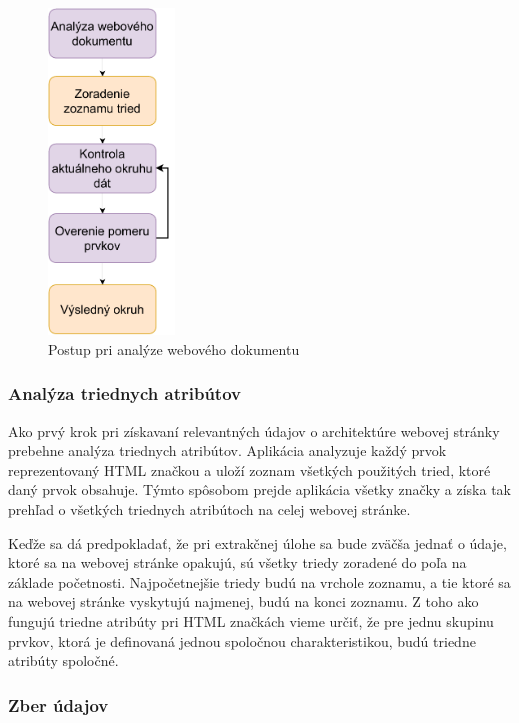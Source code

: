  \begin{figure}[hbt]
	\centering
	\includegraphics[width=0.3\textwidth]{obrazky-figures/analysis.pdf}
	\caption{Postup pri analýze webového dokumentu}
	\label{analysispdf}
\end{figure}

\newpage

\subsubsection{Analýza triednych atribútov}

Ako prvý krok pri získavaní relevantných údajov o architektúre webovej stránky prebehne analýza triednych atribútov. Aplikácia analyzuje každý prvok reprezentovaný HTML značkou a uloží zoznam všetkých použitých tried, ktoré daný prvok obsahuje. Týmto spôsobom prejde aplikácia všetky značky a získa tak prehľad o všetkých triednych atribútoch na celej webovej stránke.

Keďže sa dá predpokladať, že pri extrakčnej úlohe sa bude zväčša jednať o údaje, ktoré sa na webovej stránke opakujú, sú všetky triedy zoradené do poľa na základe početnosti. Najpočetnejšie triedy budú na vrchole zoznamu, a tie ktoré sa na webovej stránke vyskytujú najmenej, budú na konci zoznamu. Z toho ako fungujú triedne atribúty pri HTML značkách vieme určiť, že pre jednu skupinu prvkov, ktorá je definovaná jednou spoločnou charakteristikou, budú triedne atribúty spoločné. 


\subsubsection{Zber údajov}

